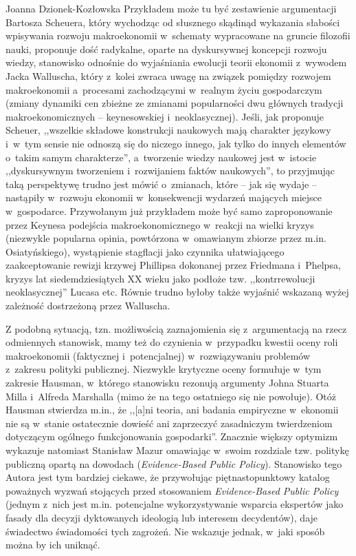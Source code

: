 \begin{recplenv}{Joanna Dzionek-Kozłowska}
Przykładem może tu być zestawienie argumentacji Bartosza Scheuera, który wychodząc od słusznego skądinąd wykazania
słabości wpisywania rozwoju makroekonomii w~schematy wypracowane na gruncie filozofii nauki, proponuje dość
radykalne, oparte na dyskursywnej koncepcji rozwoju wiedzy, stanowisko odnośnie do wyjaśniania ewolucji teorii ekonomii
z~wywodem Jacka Walluscha, który z~kolei zwraca uwagę na związek pomiędzy rozwojem makroekonomii a~procesami
zachodzącymi w~realnym życiu gospodarczym (zmiany dynamiki cen zbieżne ze zmianami popularności dwu głównych tradycji
makroekonomicznych -- keynesowskiej i~neoklasycznej). Jeśli, jak proponuje Scheuer, ,,wszelkie składowe konstrukcji
naukowych mają charakter językowy i~w~tym sensie nie odnoszą się do niczego innego, jak tylko do innych
elementów o~takim samym charakterze'', a~tworzenie wiedzy naukowej jest w~istocie ,,dyskursywnym tworzeniem i~rozwijaniem faktów
naukowych'', to przyjmując taką perspektywę trudno jest mówić o~zmianach, które -- jak się wydaje -- nastąpiły w~rozwoju
ekonomii w~konsekwencji wydarzeń mających miejsce w~gospodarce. Przywołanym już przykładem może być samo zaproponowanie
przez Keynesa podejścia makroekonomicznego w~reakcji na wielki kryzys (niezwykle popularna opinia,
powtórzona w~omawianym zbiorze przez m.in. Osiatyńskiego), wystąpienie stagflacji jako czynnika
ułatwiającego zaakceptowanie rewizji
krzywej Phillipsa dokonanej przez Friedmana i~Phelpsa, kryzys lat siedemdziesiątych XX wieku jako podłoże tzw.
,,kontrrewolucji neoklasycznej'' Lucasa etc. Równie trudno byłoby także wyjaśnić wskazaną wyżej zależność dostrzeżoną
przez Walluscha.

\enlargethispage{.5\baselineskip}

Z podobną sytuacją, tzn. możliwością zaznajomienia się z~argumentacją na rzecz odmiennych stanowisk, mamy też do
czynienia w~przypadku kwestii oceny roli makroekonomii (faktycznej i~potencjalnej) w~rozwiązywaniu problemów z~zakresu
polityki publicznej. Niezwykle krytyczne oceny formułuje w~tym zakresie Hausman, w~którego stanowisku rezonują
argumenty Johna Stuarta Milla i~Alfreda Marshalla (mimo że na tego ostatniego się nie powołuje). Otóż Hausman stwierdza
m.in., że ,,[a]ni teoria, ani badania empiryczne w~ekonomii nie są w~stanie ostatecznie dowieść ani zaprzeczyć
zasadniczym twierdzeniom dotyczącym ogólnego funkcjonowania gospodarki''. Znacznie większy optymizm wykazuje natomiast
Stanisław Mazur omawiając w~swoim rozdziale tzw. politykę publiczną opartą na dowodach (\textit{Evidence-Based Public
Policy}). Stanowisko tego Autora jest tym bardziej ciekawe, że przywołując piętnastopunktowy katalog poważnych wyzwań
stojących przed stosowaniem \textit{Evidence-Based Public Policy} (jednym z~nich jest m.in. potencjalne wykorzystywanie
wsparcia ekspertów jako fasady dla decyzji dyktowanych ideologią lub interesem decydentów), daje świadectwo świadomości
tych zagrożeń. Nie wskazuje jednak, w~jaki sposób można by ich uniknąć.


\end{recplenv}

